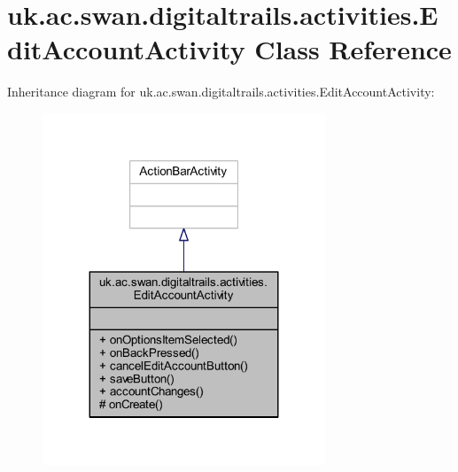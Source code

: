 \hypertarget{classuk_1_1ac_1_1swan_1_1digitaltrails_1_1activities_1_1_edit_account_activity}{\section{uk.\+ac.\+swan.\+digitaltrails.\+activities.\+Edit\+Account\+Activity Class Reference}
\label{classuk_1_1ac_1_1swan_1_1digitaltrails_1_1activities_1_1_edit_account_activity}
}


Inheritance diagram for uk.\+ac.\+swan.\+digitaltrails.\+activities.\+Edit\+Account\+Activity\+:
\nopagebreak
\begin{figure}[H]
\begin{center}
\leavevmode
\includegraphics[width=239pt]{classuk_1_1ac_1_1swan_1_1digitaltrails_1_1activities_1_1_edit_account_activity__inherit__graph}
\end{center}
\end{figure}


